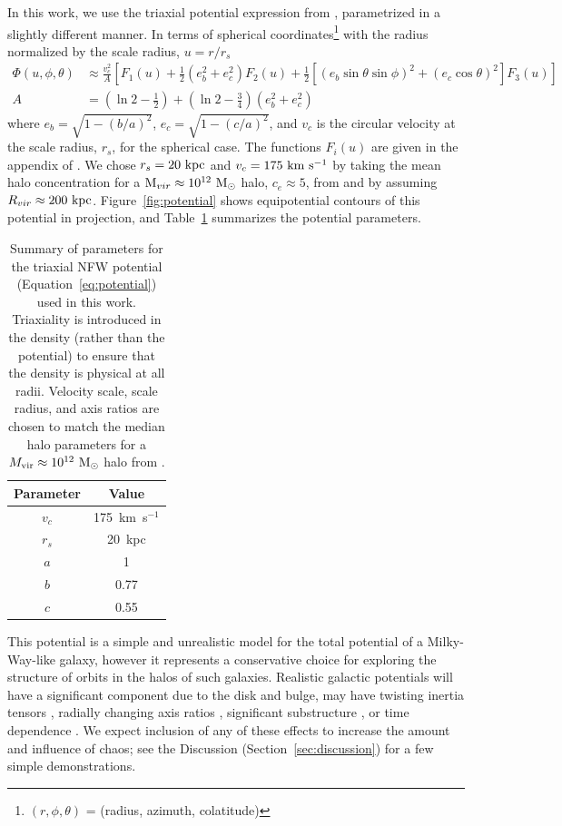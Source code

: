 \documentclass[letterpaper,12pt,preprint]{aastex}
\newcommand{\msun}{\ensuremath{\mathrm{M}_\odot}}
\begin{document}
In this work, we use the triaxial potential expression from \citet{leesuto03}, parametrized in a slightly different manner. In terms of spherical coordinates\footnote{$(r,\phi,\theta)$ = (radius, azimuth, colatitude)} with the radius normalized by the scale radius, $u = r/r_s$
\begin{align}
	\Phi(u,\phi,\theta) &\approx \frac{v_c^2}{A}\left[F_1(u) + \frac{1}{2}(e_b^2 + e_c^2)F_2(u) + \frac{1}{2} [(e_b\sin\theta \sin\phi)^2 + (e_c\cos\theta)^2] F_3(u) \right]\label{eq:potential}\\
	A &= \left(\ln2 - \frac{1}{2}\right) + \left(\ln2-\frac{3}{4}\right) (e_b^2 + e_c^2)
\end{align}
where $e_b = \sqrt{1 - (b/a)^2}$, $e_c = \sqrt{1 - (c/a)^2}$, and $v_c$ is the circular velocity at the scale radius, $r_s$, for the spherical case. The functions $F_i(u)$ are given in the appendix of \cite{leesuto03}. We chose $r_s=20~{\rm kpc}$ and $v_c = 175~{\rm km}~{\rm s}^{-1}$ by taking the mean halo concentration for a ${\rm M}_{vir} \approx 10^{12}~\msun$ halo, $c_e\approx5$, from \cite{jing02} and by assuming $R_{vir}\approx200~{\rm kpc}$. Figure~\ref{fig:potential} shows equipotential contours of this potential in projection, and Table~\ref{tbl:potential} summarizes the potential parameters.

\begin{table}[ht]
\begin{center}
	\begin{tabular}{ c  c }
	         Parameter & Value\\\toprule
		$v_c$ & 175~km~s$^{-1}$\\
		$r_s$ & 20~kpc\\
		$a$ & 1\\
		$b$ & 0.77\\
		$c$ & 0.55\\
		\bottomrule
		\end{tabular}
	\caption{Summary of parameters for the triaxial NFW potential (Equation~\ref{eq:potential}) used in this work. Triaxiality is introduced in the density (rather than the potential) to ensure that the density is physical at all radii. Velocity scale, scale radius, and axis ratios are chosen to match the median halo parameters for a $M_{\rm vir} \approx 10^{12}~\msun$ halo from \citep{jing02}. \label{tbl:potential}}
\end{center}
\end{table}

This potential is a simple and unrealistic model for the total potential of a Milky-Way-like galaxy, however it represents a conservative choice for exploring the structure of orbits in the halos of such galaxies. Realistic galactic potentials will have a significant component due to the disk and bulge, may have twisting inertia tensors \citep{romanowsky98}, radially changing axis ratios \citep[e.g.,][]{kazantzidis04,debattista08,veraciro11,butsky15}, significant substructure \citep{moore98,zemp09}, or time dependence \citep[either from bulk rotation, mass growth, mergers, etc.; see, e.g.,][]{bailin05}. We expect inclusion of any of these effects to increase the amount and influence of chaos; see the Discussion (Section~\ref{sec:discussion}) for a few simple demonstrations. 
\end{document}
